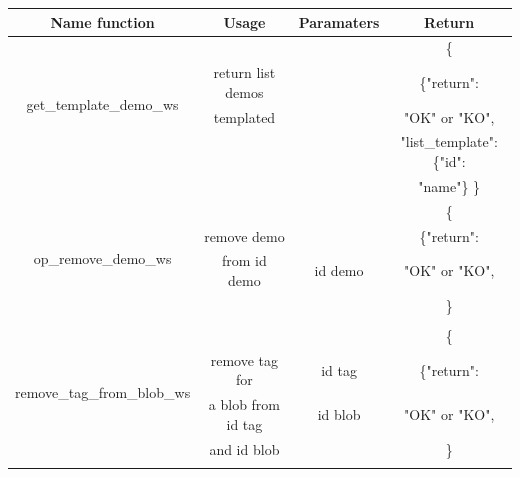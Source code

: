 \newpage
\begin{tabular}{|c||c|c|c|}
  \hline
  Name function & Usage & Paramaters & Return \tabularnewline
  \hline
  \multirow{4}{*}{get\_template\_demo\_ws}
  &                      &      & \{ \\
  & return list demos    &      & \{"return": \\
  & templated            &      & "OK" or "KO", \\
  &                      &       &  "list\_template": \{"id": \\
  &                      &       & "name"\} \} \\
  \hline
  \multirow{4}{*}{op\_remove\_demo\_ws}
  &                      &      & \{ \\
  & remove demo          &      & \{"return": \\
  & from id demo         & id demo & "OK" or "KO", \\
  &                      &       & \} \\
  &                      &       &  \\
  \hline
  \multirow{4}{*}{remove\_tag\_from\_blob\_ws}
  &                      &      & \{ \\
  & remove tag for       & id tag     & \{"return": \\
  & a blob from id tag   & id blob & "OK" or "KO", \\
  & and id blob          &       & \} \\
  &                      &       &  \\
  \hline
\end{tabular}


